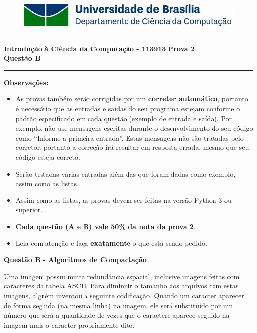 \documentclass[a4paper, 12pt]{article}
\begin{document}
\begin{figure}[H]
	\includegraphics[scale=0.9]{UnB_CiC_Logo.jpg}
\end{figure}
\noindent\rule{\textwidth}{0.4pt}
\begin{center}
	\textbf{{\Large Introdução à Ciência da Computação - 113913}} \newline \newline
	\textbf{{\large Prova 2} \\
	\vspace{9pt}
	{\large Questão B}} \\
	\noindent\rule{\textwidth}{0.4pt}
	\newline
\end{center}

\textbf{{\large Observações:}}
\begin{itemize}
	\item As provas também serão corrigidas por um \textbf{corretor automático}, portanto é necessário que as entradas e saídas do seu programa estejam conforme o padrão especificado em cada questão (exemplo de entrada e saída). Por exemplo, não use mensagens escritas durante o desenvolvimento do seu código como “Informe a primeira entrada”. Estas mensagens não são tratadas pelo corretor, portanto a correção irá resultar em resposta errada, mesmo que seu código esteja correto.
	\item Serão testadas várias entradas além das que foram dadas como exemplo, assim como as listas.
	\item Assim como as listas, as provas devem ser feitas na versão Python 3 ou superior.
	\item \textbf{Cada questão (A e B) vale 50\% da nota da prova 2}.
	\item Leia com atenção e faça \textbf{exatamente} o que está sendo pedido.
\end{itemize}
\newpage %
\begin{center}
\textbf{{\Large Questão B - Algoritmos de Compactação}}
\end{center}
\vspace{5pt}

Uma imagem possui muita redundância espacial, inclusive imagens feitas com caracteres da tabela ASCII. Para diminuir o tamanho dos arquivos com estas imagens, alguém inventou a seguinte codificação. Quando um caracter aparecer de forma seguida (na mesma linha) na imagem, ele será substituído por um número que será a quantidade de vezes que o caractere aparece seguido na imagem mais o caracter propriamente dito.
\end{document}

